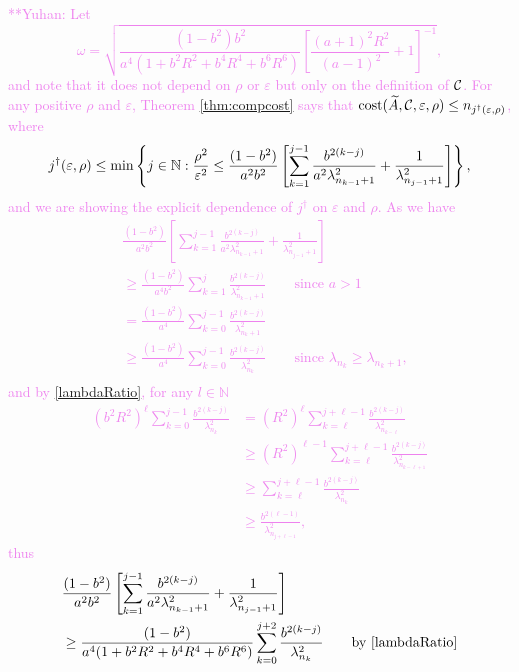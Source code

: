 \documentclass[graybox,footinfo]{svmult}
\newcommand{\yuhannote}[1]{ {\textcolor{violet}  {\mbox{**Yuhan:} #1}}}
\begin{document}
\yuhannote{Let  
\begin{equation} \label{newomegadef}
    \omega = \sqrt{\frac{(1 - b^2)b^2}{a^4(1 + b^2R^2 + b^4R^4 + b^6R^6)}\left[\frac{(a+1)^{2} R^2 }{(a-1)^2} + 1\right]^{-1}},
\end{equation}
and note that it does not depend on $\rho$ or $\varepsilon$ but only on the definition of ${\mathcal{C}}$. 
For any positive $\rho$ and $\varepsilon$, Theorem \ref{thm:compcost} says that $\textup{cost}(\widetilde{A},{\mathcal{C}},\varepsilon,\rho) \le n_{j^\dagger(\varepsilon,\rho)}$, where 
\[
j^\dagger(\varepsilon,\rho) \le \min \left \{j \in {\mathbb{N}} : \frac{\rho^2}{\varepsilon^2} \le \frac{(1 - b^2)}{a^2b^2} \left[ \sum_{k=1}^{j-1} \frac{b^{2(k-j)}}{a^2\lambda_{n_{k-1}+1}^2} + \frac{1}{\lambda_{n_{j-1}+1}^2}\right]   \right\}, \]
and we are showing the explicit dependence of $j^\dagger$ on $\varepsilon$ and $\rho$.
As we have
\begin{align*} 
 & \frac{(1 - b^2)}{a^2b^2} \left[ \sum_{k=1}^{j-1} \frac{b^{2(k-j)}}{a^2\lambda_{n_{k-1}+1}^2} + \frac{1}{\lambda_{n_{j-1}+1}^2}\right]   \\
&\ge  \frac{(1 - b^2)}{a^4b^2} \sum_{k=1}^{j} \frac{b^{2(k-j)}}{\lambda_{n_{k-1}+1}^2}  \qquad \text{since } a > 1\\
&=  \frac{(1 - b^2)}{a^4} \sum_{k=0}^{j-1} \frac{b^{2(k-j)}}{\lambda_{n_{k}+1}^2}  \\
&\ge  \frac{(1 - b^2)}{a^4} \sum_{k=0}^{j-1} \frac{b^{2(k-j)}}{\lambda_{n_{k}}^2}  \qquad \text{since } \lambda_{n_k} \ge \lambda_{n_k+1},\\
\end{align*}
and by \eqref{lambdaRatio}, for any $l \in \mathbb{N}$
\begin{align*}
(b^2R^2)^\ell \sum_{k=0}^{j-1} \frac{b^{2(k-j)}}{\lambda_{n_{k}}^2} & = (R^2)^\ell\sum_{k=\ell}^{j+\ell-1} \frac{b^{2(k-j)}}{\lambda_{n_{k-\ell}}^2} \\
& \geq (R^2)^{\ell-1}\sum_{k=\ell}^{j+\ell-1} \frac{b^{2(k-j)}}{\lambda_{n_{k-\ell+1}}^2} \\
& \geq \sum_{k=\ell}^{j+\ell-1} \frac{b^{2(k-j)}}{\lambda_{n_{k}}^2} \\
& \geq \frac{b^{2(\ell-1)}}{\lambda_{n_{j+\ell-1}}^2},
\end{align*}
thus 
\begin{align*} 
 & \frac{(1 - b^2)}{a^2b^2} \left[ \sum_{k=1}^{j-1} \frac{b^{2(k-j)}}{a^2\lambda_{n_{k-1}+1}^2} + \frac{1}{\lambda_{n_{j-1}+1}^2}\right]   \\
&\ge  \frac{(1 - b^2)}{a^4(1 + b^2R^2 + b^4R^4 + b^6R^6)} \sum_{k=0}^{j+2} \frac{b^{2(k-j)}}{\lambda_{n_{k}}^2}  \qquad \text{by \eqref{lambdaRatio}}\\

\end{align*}}
\end{document}

